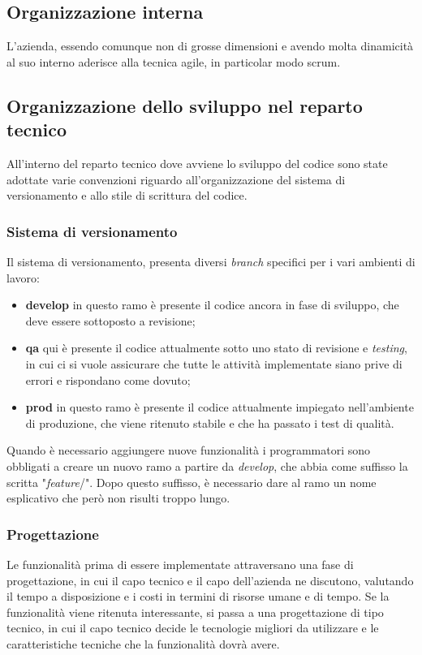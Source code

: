 \subsection{Organizzazione interna}

L'azienda, essendo comunque non di grosse dimensioni e avendo molta dinamicità
al suo interno aderisce alla tecnica \gls{agile}, in particolar modo
\gls{scrum}.

\subsection{Organizzazione dello sviluppo nel reparto tecnico}
\label{intro:OrganizzazioneSviluppoRepartoTecnico}

All'interno del reparto tecnico dove avviene lo sviluppo del codice sono state
adottate varie convenzioni riguardo all'organizzazione del sistema di
versionamento e allo stile di scrittura del codice.

\subsubsection{Sistema di versionamento}

Il sistema di versionamento, presenta diversi \textit{branch} specifici per i
vari ambienti di lavoro:
\begin{itemize}

\item \textbf{develop} in questo ramo è presente il codice ancora in fase di
sviluppo, che deve essere sottoposto a revisione;
\item \textbf{qa} qui è presente il codice attualmente sotto uno stato di
revisione e \textit{testing}, in cui ci si vuole assicurare che tutte le
attività implementate siano prive di errori e rispondano come dovuto;
\item \textbf{prod} in questo ramo è presente il codice attualmente impiegato
nell'ambiente di produzione, che viene ritenuto stabile e che ha passato i test
di qualità.
\end{itemize}

Quando è necessario aggiungere nuove funzionalità i programmatori sono
obbligati a creare un nuovo ramo a partire da \textit{develop}, che abbia come
suffisso la scritta "\textit{feature}/". Dopo questo suffisso, è necessario dare
al ramo un nome esplicativo che però non risulti troppo lungo.

\subsubsection{Progettazione}
Le funzionalità prima di essere implementate attraversano una fase di
progettazione, in cui il capo tecnico e il capo dell'azienda ne discutono,
valutando il tempo a disposizione e i costi in termini di risorse umane e di
tempo. Se la funzionalità viene ritenuta interessante, si passa a una
progettazione di tipo tecnico, in cui il capo tecnico decide le tecnologie
migliori da utilizzare e le caratteristiche tecniche che la funzionalità dovrà
avere.

